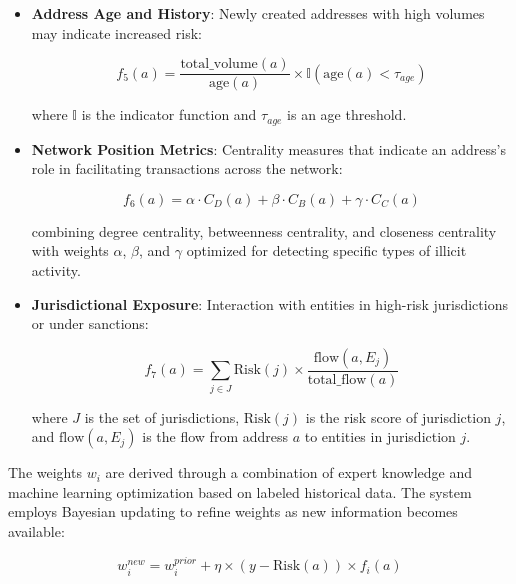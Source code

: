 \documentclass[conference]{IEEEtran}
\begin{document}
\begin{itemize}
    where $T_a$ is the set of transactions involving address $a$, and $\mu_T$ and $\sigma_T$ are the mean and standard deviation of transaction values across the network.
    
    \item \textbf{Address Age and History}: Newly created addresses with high volumes may indicate increased risk:
    
    \begin{equation}
    f_5(a) = \frac{\text{total\_volume}(a)}{\text{age}(a)} \times \mathbb{I}(\text{age}(a) < \tau_{age})
    \end{equation}
    
    where $\mathbb{I}$ is the indicator function and $\tau_{age}$ is an age threshold.
    
    \item \textbf{Network Position Metrics}: Centrality measures that indicate an address's role in facilitating transactions across the network:
    
    \begin{equation}
    f_6(a) = \alpha \cdot C_D(a) + \beta \cdot C_B(a) + \gamma \cdot C_C(a)
    \end{equation}
    
    combining degree centrality, betweenness centrality, and closeness centrality with weights $\alpha$, $\beta$, and $\gamma$ optimized for detecting specific types of illicit activity.
    
    \item \textbf{Jurisdictional Exposure}: Interaction with entities in high-risk jurisdictions or under sanctions:
    
    \begin{equation}
    f_7(a) = \sum_{j \in J} \text{Risk}(j) \times \frac{\text{flow}(a,E_j)}{\text{total\_flow}(a)}
    \end{equation}
    
    where $J$ is the set of jurisdictions, $\text{Risk}(j)$ is the risk score of jurisdiction $j$, and $\text{flow}(a,E_j)$ is the flow from address $a$ to entities in jurisdiction $j$.
\end{itemize}

The weights $w_i$ are derived through a combination of expert knowledge and machine learning optimization based on labeled historical data. The system employs Bayesian updating to refine weights as new information becomes available:

\begin{equation}
w_i^{new} = w_i^{prior} + \eta \times (y - \text{Risk}(a)) \times f_i(a)
\end{equation}
\end{document}
